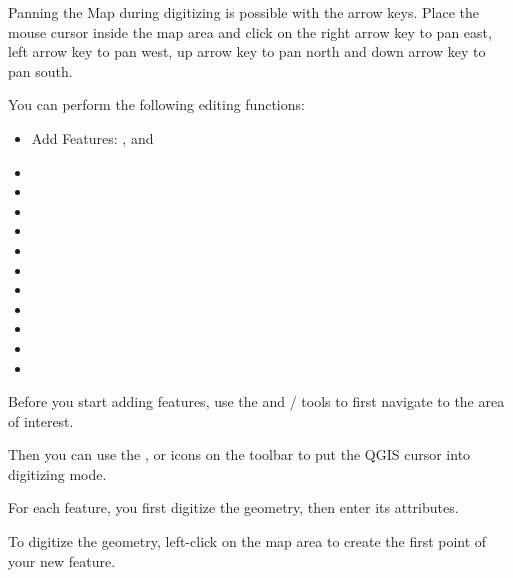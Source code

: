 
Panning the Map during digitizing is possible with the arrow keys. Place
the mouse cursor inside the map area and click on the right arrow key to
pan east, left arrow key to pan west, up arrow key to pan north and down arrow 
key to pan south.

You can perform the following editing functions:

\begin{itemize}
\item Add Features: ,
   and
\item {}
\item {}
\item {}
\item {}
\item {}
\item {}
\item {}
\item {}
\item {}
\item {}
\item {}
\end{itemize}


Before you start adding features, use the 
and / tools to first navigate to the area of interest.

Then you can use the ,
 or
 icons on the toolbar to put the QGIS cursor
into digitizing mode.

For each feature, you first digitize the geometry, then enter its attributes.

To digitize the geometry, left-click on the map area to create the
first point of your new feature.

